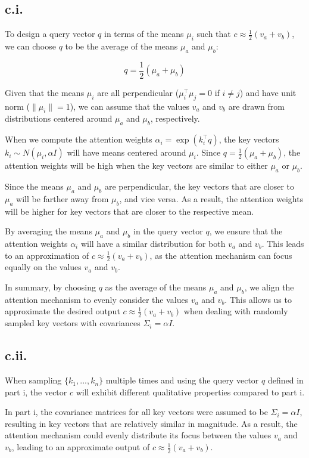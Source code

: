 \documentclass[a4paper]{article}
\begin{document}
\subsection*{c.i.}

To design a query vector $q$ in terms of the means $\mu_i$ such that $c \approx \frac{1}{2} (v_a + v_b)$, we can choose $q$ to be the average of the means $\mu_a$ and $\mu_b$:

\[ q = \frac{1}{2} (\mu_a + \mu_b) \]


Given that the means $\mu_i$ are all perpendicular ($\mu_i^\top \mu_j = 0$ if $i \neq j$) and have unit norm ($\|\mu_i\| = 1$), we can assume that the values $v_a$ and $v_b$ are drawn from distributions centered around $\mu_a$ and $\mu_b$, respectively.

When we compute the attention weights $\alpha_i = \exp(k_i^\top q)$, the key vectors $k_i \sim N(\mu_i, \alpha I)$ will have means centered around $\mu_i$. Since $q = \frac{1}{2} (\mu_a + \mu_b)$, the attention weights will be high when the key vectors are similar to either $\mu_a$ or $\mu_b$.

Since the means $\mu_a$ and $\mu_b$ are perpendicular, the key vectors that are closer to $\mu_a$ will be farther away from $\mu_b$, and vice versa. As a result, the attention weights will be higher for key vectors that are closer to the respective mean.

By averaging the means $\mu_a$ and $\mu_b$ in the query vector $q$, we ensure that the attention weights $\alpha_i$ will have a similar distribution for both $v_a$ and $v_b$. This leads to an approximation of $c \approx \frac{1}{2} (v_a + v_b)$, as the attention mechanism can focus equally on the values $v_a$ and $v_b$.

In summary, by choosing $q$ as the average of the means $\mu_a$ and $\mu_b$, we align the attention mechanism to evenly consider the values $v_a$ and $v_b$. This allows us to approximate the desired output $c \approx \frac{1}{2} (v_a + v_b)$ when dealing with randomly sampled key vectors with covariances $\Sigma_i = \alpha I$.


\subsection*{c.ii.}
When sampling $\{k_1, ..., k_n\}$ multiple times and using the query vector $q$ defined in part i, the vector $c$ will exhibit different qualitative properties compared to part i.

In part i, the covariance matrices for all key vectors were assumed to be $\Sigma_i = \alpha I$, resulting in key vectors that are relatively similar in magnitude. As a result, the attention mechanism could evenly distribute its focus between the values $v_a$ and $v_b$, leading to an approximate output of $c \approx \frac{1}{2} (v_a + v_b)$.
\end{document}
